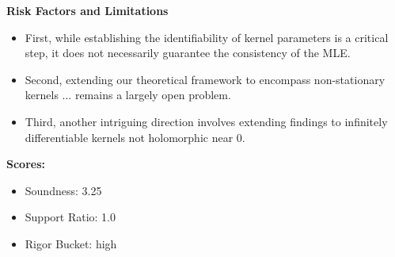 \begin{tcolorbox}[title=\textbf{Example: High-Soundness Proposal}]
\textbf{Risk Factors and Limitations}
\begin{itemize}
\item First, while establishing the identifiability of kernel parameters is a critical step, it does not necessarily guarantee the consistency of the MLE.
\item Second, extending our theoretical framework to encompass non-stationary kernels ... remains a largely open problem.
\item Third, another intriguing direction involves extending findings to infinitely differentiable kernels not holomorphic near 0.
\end{itemize}

\vspace{0.3em}
\textbf{Scores:}
\begin{itemize}
  \item Soundness: 3.25
  \item Support Ratio: 1.0
  \item Rigor Bucket: high
\end{itemize}

\end{tcolorbox}


